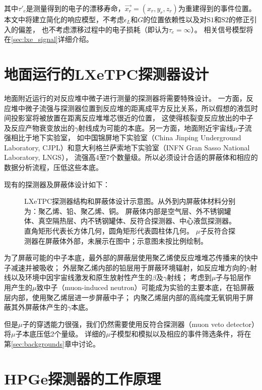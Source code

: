 其中$\tau'_e$是测量得到的电子的漂移寿命，$\vec{x_r}=(x_r,y_r,z_r)$为重建得到的事件位置。
本文中将建立简化的响应模型，不考虑$\epsilon_L$和$G$的位置依赖性以及对$\mathrm{S1}$和$\mathrm{S2}$的修正引入的偏差，
也不考虑漂移过程中的电子损耗（即认为$\tau_e=\infty$）。
相关信号模型将在\ref{sec:lxe_signal}详细介绍。

\section{地面运行的LXeTPC探测器设计}

地面附近运行的对反应堆中微子进行测量的探测器将需要特殊设计。
一方面，反应堆中微子流强与探测器位置到反应堆的距离成平方反比关系，所以假想的液氙时间投影室将被放置在距离反应堆堆芯很近的位置，
这使得核裂变反应放出的中子及反应产物衰变放出的$\gamma$射线成为可能的本底。另一方面，地面附近宇宙线$\mu$子流强相比于地下实验室，
如中国锦屏地下实验室（China Jinping Underground Laboratory, CJPL）和意大利格兰萨索地下实验室（INFN Gran Sasso National Laboratory, LNGS），
流强高4至7个数量级\cite{guo_muon_2021}。所以必须设计合适的屏蔽体和相应的数据分析流程，压低这些本底。

现有的探测器及屏蔽体设计如下：

\begin{figure}
    \centering
    
    \caption{\label{fig:relics_geo} LXeTPC探测器结构和屏蔽体设计示意图。从外到内屏蔽体材料分别为：聚乙烯、铅、聚乙烯、铜。
    屏蔽体内部是空气层、外不锈钢罐体、真空隔热层、内不锈钢罐体、反符合探测器、中心液氙探测器。
    直角矩形代表长方体几何，圆角矩形代表圆柱体几何。
    $\mu$子反符合探测器在屏蔽体外部，未展示在图中；示意图未按比例绘制。}
\end{figure}

为了屏蔽可能的中子本底，最外部的屏蔽层使用聚乙烯使反应堆堆芯传播来的快中子减速并被吸收；
外层聚乙烯内部的铅层用于屏蔽环境辐射，如反应堆方向的$\gamma$射线以及环境中因宇宙线激发和原生放射性产生的$\beta$及$\gamma$射线；
考虑到$\mu$子与铅层作用产生的$\mu$致中子（muon-induced neutron）可能成为实验的主要本底，在铅屏蔽层内部，使用聚乙烯层进一步屏蔽中子；
内聚乙烯层内部的高纯度无氧铜用于屏蔽其外屏蔽体产生的$\gamma$本底。

但是$\mu$子的穿透能力很强，我们仍然需要使用反符合探测器（muon veto detector）将$\mu$子本底压低2个量级。
详细的$\mu$子模型和模拟以及相应的事件筛选条件，将在第\ref{sec:backgrounds}章中讨论。

\section{HPGe探测器的工作原理}

